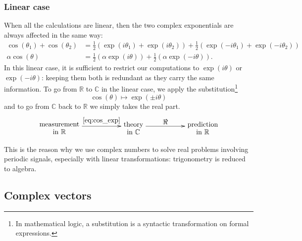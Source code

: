 \subsubsection{Linear case}
When all the calculations are linear, then the two complex exponentials are always affected in the same way:
\begin{align*}
    \cos(\theta_1) + \cos(\theta_2)
    &=
    \frac{1}{2}(\exp(i \theta_1) + \exp(i \theta_2))
    +
    \frac{1}{2}(\exp(-i \theta_1) + \exp(-i \theta_2))
    \\
    \alpha \cos(\theta)
    &=
    \frac{1}{2}(\alpha\exp(i \theta))
    +
    \frac{1}{2}(\alpha\exp(-i \theta))
    \text{.}
\end{align*}
In this linear case, it is sufficient to restrict our computations to $\exp(i \theta)$ or $\exp(-i \theta)$: keeping them both is redundant as they carry the same information.
To go from $\mathbb{R}$ to $\mathbb{C}$ in the linear case, we apply the substitution\footnote{In mathematical logic, a substitution is a syntactic transformation on formal expressions.}
\begin{equation}
    \cos(\theta) \mapsto \exp(\pm i \theta)
    \label{eq:cos_exp}
\end{equation}
and to go from $\mathbb{C}$ back to $\mathbb{R}$ we simply takes the real part.
\begin{equation*}
    \xymatrix@M=4pt{
        \txt{measurement\\in $\mathbb{R}$}
        \ar[rr]^-*\txt{\cref{eq:cos_exp}}
        &&
        \txt{theory\\in $\mathbb{C}$}
        \ar[rr]^-*{\Re}
        &&
        \txt{prediction\\in $\mathbb{R}$}
    }
\end{equation*}

This is the reason why we use complex numbers to solve real problems involving periodic signals, especially with linear transformations: trigonometry is reduced to algebra.





\subsection{Complex vectors}

